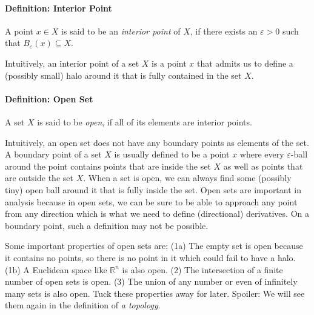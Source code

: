 \paragraph{Definition: Interior Point} A point $x \in X$ is said to be an \emph{interior point} of $X$, if there exists an $\varepsilon > 0$ such that $B_\varepsilon(x) \subseteq X$. 


\medskip
Intuitively, an interior point of a set $X$ is a point $x$ that admits us to define a (possibly small) halo around it that is fully contained in the set $X$.

\paragraph{Definition: Open Set} A set $X$ is said to be \emph{open}, if all of its elements are interior points. 


\medskip
Intuitively, an open set does not have any boundary points as elements of the set. A boundary point of a set $X$ is usually defined to be a point $x$ where every $\varepsilon$-ball around the point contains points that are inside the set $X$ as well as points that are outside the set $X$. When a set is open, we can always find some (possibly tiny) open ball around it that is fully inside the set. Open sets are important in analysis because in open sets, we can be sure to be able to approach any point from any direction which is what we need to define (directional) derivatives. On a boundary point, such a definition may not be possible.

\medskip
Some important properties of open sets are: (1a) The empty set is open because it contains no points, so there is no point in it which could fail to have a halo. (1b) A Euclidean space like $\mathbb{R}^n$ is also open. (2) The intersection of a finite number of open sets is open. (3) The union of any number or even of infinitely many sets is also open. Tuck these properties away for later. Spoiler: We will see them again in the definition of \emph{a topology}.


